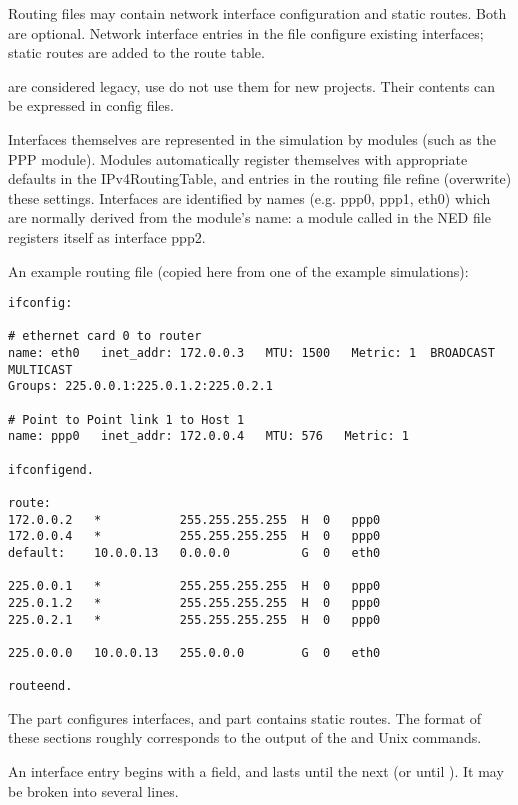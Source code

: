Routing files may contain network interface configuration and static
routes. Both are optional. Network interface entries in the file
configure existing interfaces; static routes are added to the route table.

\begin{warning}
 are considered legacy, use do not use them for new
projects. Their contents can be expressed in 
config files.
\end{warning}

Interfaces themselves are represented in the simulation by modules
(such as the PPP module). Modules automatically register themselves
with appropriate defaults in the IPv4RoutingTable, and entries in the
routing file refine (overwrite) these settings.
Interfaces are identified by names (e.g. ppp0, ppp1, eth0) which
are normally derived from the module's name: a module called
 in the NED file registers itself as interface ppp2.

An example routing file (copied here from one of the example simulations):

\begin{verbatim}
ifconfig:

# ethernet card 0 to router
name: eth0   inet_addr: 172.0.0.3   MTU: 1500   Metric: 1  BROADCAST MULTICAST
Groups: 225.0.0.1:225.0.1.2:225.0.2.1

# Point to Point link 1 to Host 1
name: ppp0   inet_addr: 172.0.0.4   MTU: 576   Metric: 1

ifconfigend.

route:
172.0.0.2   *           255.255.255.255  H  0   ppp0
172.0.0.4   *           255.255.255.255  H  0   ppp0
default:    10.0.0.13   0.0.0.0          G  0   eth0

225.0.0.1   *           255.255.255.255  H  0   ppp0
225.0.1.2   *           255.255.255.255  H  0   ppp0
225.0.2.1   *           255.255.255.255  H  0   ppp0

225.0.0.0   10.0.0.13   255.0.0.0        G  0   eth0

routeend.
\end{verbatim}

The  part configures interfaces,
and  part contains static routes.
The format of these sections roughly corresponds to the output
of the  and  Unix commands.

An interface entry begins with a  field, and lasts until
the next  (or until ). It may
be broken into several lines.

